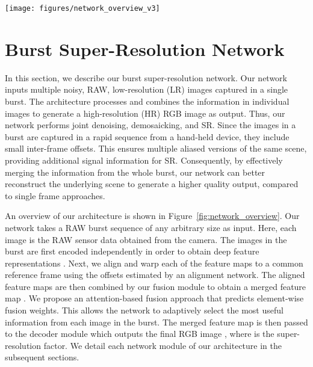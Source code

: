 \begin{figure*}[t]
    \centering \texttt{[image: figures/network\_overview\_v3]}\caption{An overview of our burst super-resolution architecture. Each image  in the input burst is first passed independently through the encoder. The resulting feature maps are then warped to the base frame () coordinates using the flow vectors  predicted by the alignment module. The aligned feature maps are then merged using an attention-based fusion module, using fusion weights computed by the weight predictor. The merged feature map  is then passed through to decoder module to obtain the super-resolved RGB image as output.}\vspace{-4mm}
    \label{fig:network_overview}
\end{figure*}

\section{Burst Super-Resolution Network}
In this section, we describe our burst super-resolution network. Our network inputs multiple noisy, RAW, low-resolution (LR) images captured in a single burst.
The architecture processes and combines the information in individual images to generate a high-resolution (HR) RGB image as output. Thus, our network performs joint denoising, demosaicking, and SR. Since the images in a burst are captured in a rapid sequence from a hand-held device, they include small inter-frame offsets. This ensures multiple aliased versions of the same scene, providing additional signal information for SR. Consequently, by effectively merging the information from the whole burst, our network can better reconstruct the underlying scene to generate a higher quality output, compared to single frame approaches. 

An overview of our architecture is shown in Figure~\ref{fig:network_overview}. Our network takes a RAW burst sequence  of any arbitrary size  as input. Here, each image  is the RAW sensor data obtained from the camera. The images in the burst are first encoded independently in order to obtain deep feature representations . Next, we align and warp each of the feature maps to a common reference frame  using the offsets estimated by an alignment network. The aligned feature maps are then combined by our fusion module to obtain a merged feature map . We propose an attention-based fusion approach that predicts element-wise fusion weights. This allows the network to adaptively select the most useful information from each image in the burst. The merged feature map is then passed to the decoder module which outputs the final RGB image , where  is the super-resolution factor. We detail each network module of our architecture in the subsequent sections.

